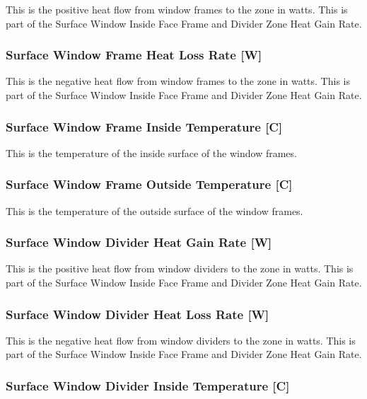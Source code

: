 This is the positive heat flow from window frames to the zone in watts. This is part of the Surface Window Inside Face Frame and Divider Zone Heat Gain Rate.

\subsubsection{Surface Window Frame Heat Loss Rate {[}W{]}}\label{surface-window-frame-heat-loss-rate-w}

This is the negative heat flow from window frames to the zone in watts. This is part of the Surface Window Inside Face Frame and Divider Zone Heat Gain Rate.

\subsubsection{Surface Window Frame Inside Temperature {[}C{]}}\label{surface-window-frame-inside-temperature-c}

This is the temperature of the inside surface of the window frames.

\subsubsection{Surface Window Frame Outside Temperature {[}C{]}}\label{surface-window-frame-outside-temperature-c}

This is the temperature of the outside surface of the window frames.

\subsubsection{Surface Window Divider Heat Gain Rate {[}W{]}}\label{surface-window-divider-heat-gain-rate-w}

This is the positive heat flow from window dividers to the zone in watts. This is part of the Surface Window Inside Face Frame and Divider Zone Heat Gain Rate.

\subsubsection{Surface Window Divider Heat Loss Rate {[}W{]}}\label{surface-window-divider-heat-loss-rate-w}

This is the negative heat flow from window dividers to the zone in watts. This is part of the Surface Window Inside Face Frame and Divider Zone Heat Gain Rate.

\subsubsection{Surface Window Divider Inside Temperature {[}C{]}}\label{surface-window-divider-inside-temperature-c}

